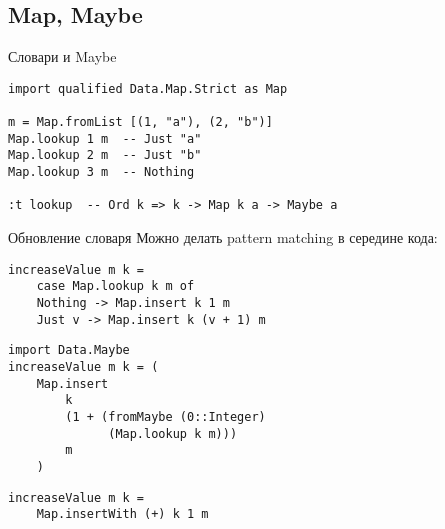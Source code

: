 \subsection{Map, Maybe}

\begin{frame}
\end{frame}

\begin{frame}[t,fragile]{Словари и Maybe}
\begin{verbatim}
import qualified Data.Map.Strict as Map

m = Map.fromList [(1, "a"), (2, "b")]
Map.lookup 1 m  -- Just "a"
Map.lookup 2 m  -- Just "b"
Map.lookup 3 m  -- Nothing

:t lookup  -- Ord k => k -> Map k a -> Maybe a
\end{verbatim}
\end{frame}

\begin{frame}[t,fragile]{Обновление словаря}
	Можно делать pattern matching в середине кода:
\begin{verbatim}
increaseValue m k =
    case Map.lookup k m of
    Nothing -> Map.insert k 1 m
    Just v -> Map.insert k (v + 1) m
\end{verbatim}
\pause
\begin{verbatim}
import Data.Maybe
increaseValue m k = (
    Map.insert
        k
        (1 + (fromMaybe (0::Integer) 
              (Map.lookup k m)))
        m
    )
\end{verbatim}
\pause
\begin{verbatim}
increaseValue m k =
    Map.insertWith (+) k 1 m
\end{verbatim}
\end{frame}
